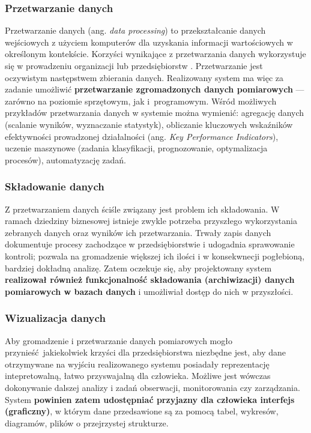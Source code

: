 \documentclass[a4paper, 12pt, twoside]{article}
\begin{document}
\subsubsection{Przetwarzanie danych}

Przetwarzanie danych (ang. \emph{data processing}) to przekształcanie danych
wejściowych z użyciem komputerów dla uzyskania informacji
wartościowych w określonym kontekście. Korzyści wynikające z przetwarzania
danych wykorzystuje się w prowadzeniu organizacji lub przedsiębiorstw \cite{data-processing}.
Przetwarzanie jest oczywistym następstwem zbierania danych. Realizowany
system ma więc za zadanie umożliwić \textbf{przetwarzanie zgromadzonych danych pomiarowych}
--- zarówno na poziomie sprzętowym, jak i~programowym. Wśród możliwych przykładów
przetwarzania danych w systemie można wymienić: agregację danych
(scalanie wyników, wyznaczanie statystyk),
obliczanie kluczowych wskaźników efektywności prowadzonej działalności
(ang. \emph{Key Performance Indicators}), uczenie maszynowe
(zadania klasyfikacji, prognozowanie, optymalizacja procesów), automatyzację zadań.

\subsubsection{Składowanie danych}

Z przetwarzaniem danych ściśle związany jest problem ich składowania.
W ramach dziedziny biznesowej istnieje zwykle potrzeba przyszłego wykorzystania
zebranych danych oraz wyników ich przetwarzania. Trwały zapis danych dokumentuje
procesy zachodzące w przedsiębiorstwie i udogadnia sprawowanie kontroli; pozwala
na gromadzenie większej ich ilości i w konsekwnecji pogłebioną, bardziej dokładną
analizę. Zatem oczekuje się, aby projektowany system \textbf{realizował również
    funkcjonalność składowania (archiwizacji) danych pomiarowych w bazach danych}
i umożliwiał dostęp do nich w przyszłości.

\subsubsection{Wizualizacja danych}

Aby gromadzenie i przetwarzanie danych pomiarowych mogło przynieść jakiekolwiek 
krzyści dla przedsiębiorstwa niezbędne jest, aby dane otrzymywane na wyjściu realizowanego 
systemu posiadały reprezentację intepretowalną, łatwo przyswajalną dla człowieka. 
Możliwe jest wówczas dokonywanie dalszej analizy i zadań obserwacji, monitorowania
czy zarządzania. System \textbf{powinien zatem udostępniać przyjazny dla człowieka
interfejs (graficzny)}, w którym dane przedsawione są za pomocą tabel, wykresów,
diagramów, plików o przejrzystej strukturze.
\end{document}
